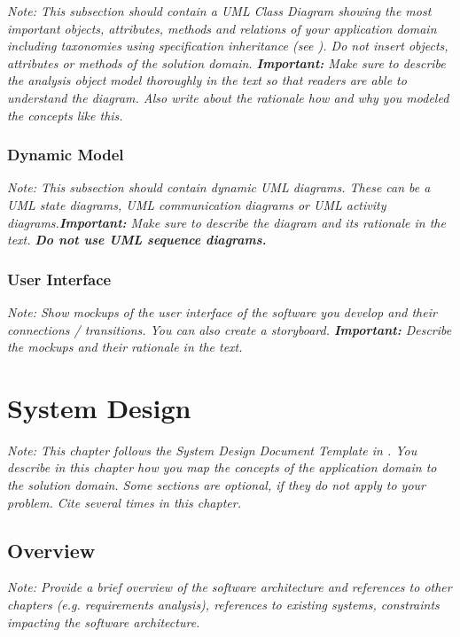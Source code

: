\documentclass[a4paper,12pt,twoside]{report}
\begin{document}
\textit{Note: This subsection should contain a UML Class Diagram showing the most important objects, attributes, methods and relations of your application domain including taxonomies using specification inheritance (see \cite{bruegge2004object}). Do not insert objects, attributes or methods of the solution domain.
	\textbf{Important:} Make sure to describe the analysis object model thoroughly in the text so that readers are able to understand the diagram. Also write about the rationale how and why you modeled the concepts like this.}

\subsection{Dynamic Model}

\textit{Note: This subsection should contain dynamic UML diagrams. These can be a UML state diagrams, UML communication diagrams or UML activity diagrams.\textbf{Important:} Make sure to describe the diagram and its rationale in the text. \textbf{Do not use UML sequence diagrams.}}

\subsection{User Interface}

\textit{Note: Show mockups of the user interface of the software you develop and their connections / transitions. You can also create a storyboard. \textbf{Important:} Describe the mockups and their rationale in the text.}




\chapter{System Design}

\textit{Note: This chapter follows the System Design Document Template in \cite{bruegge2004object}.
	You describe in this chapter how you map the concepts of the application domain to the solution domain. Some sections are optional, if they do not apply to your problem.
	Cite \cite{bruegge2004object} several times in this chapter.}

\section{Overview}

\textit{Note: Provide a brief overview of the software architecture and references to other chapters (e.g. requirements analysis), references to existing systems, constraints impacting the software architecture.}
\end{document}
